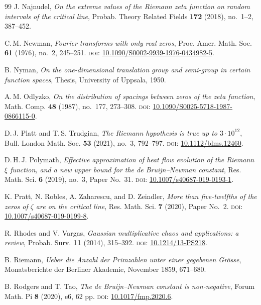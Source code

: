 \documentclass[11pt]{amsart}
\theoremstyle{definition}
\theoremstyle{remark}
\begin{document}
\begin{thebibliography}{99}
J. Najnudel,
\textit{On the extreme values of the Riemann zeta function on random intervals of the critical line},
Probab. Theory Related Fields \textbf{172} (2018), no.~1--2, 387--452.

C.\,M. Newman,
\textit{Fourier transforms with only real zeros},
Proc. Amer. Math. Soc. \textbf{61} (1976), no.~2, 245--251.
\textsc{doi:} \href{https://doi.org/10.1090/S0002-9939-1976-0434982-5}{10.1090/S0002-9939-1976-0434982-5}.

B. Nyman,
\textit{On the one-dimensional translation group and semi-group in certain function spaces},
Thesis, University of Uppsala, 1950.

A.\,M. Odlyzko,
\textit{On the distribution of spacings between zeros of the zeta function},
Math. Comp. \textbf{48} (1987), no.~177, 273--308.
\textsc{doi:} \href{https://doi.org/10.1090/S0025-5718-1987-0866115-0}{10.1090/S0025-5718-1987-0866115-0}.

D.\,J. Platt and T.\,S. Trudgian,
\textit{The Riemann hypothesis is true up to $3 \cdot 10^{12}$},
Bull. London Math. Soc. \textbf{53} (2021), no.~3, 792--797.
\textsc{doi:} \href{https://doi.org/10.1112/blms.12460}{10.1112/blms.12460}.

D.\,H.\,J. Polymath,
\textit{Effective approximation of heat flow evolution of the Riemann $\xi$ function, and a new upper bound for the de Bruijn--Newman constant},
Res. Math. Sci. \textbf{6} (2019), no.~3, Paper No.~31.
\textsc{doi:} \href{https://doi.org/10.1007/s40687-019-0193-1}{10.1007/s40687-019-0193-1}.

K. Pratt, N. Robles, A. Zaharescu, and D. Zeindler,
\textit{More than five-twelfths of the zeros of $\zeta$ are on the critical line},
Res. Math. Sci. \textbf{7} (2020), Paper No.~2.
\textsc{doi:} \href{https://doi.org/10.1007/s40687-019-0199-8}{10.1007/s40687-019-0199-8}.

R. Rhodes and V. Vargas,
\textit{Gaussian multiplicative chaos and applications: a review},
Probab. Surv. \textbf{11} (2014), 315--392.
\textsc{doi:} \href{https://doi.org/10.1214/13-PS218}{10.1214/13-PS218}.

B. Riemann,
\textit{Ueber die Anzahl der Primzahlen unter einer gegebenen Gr\"osse},
Monatsberichte der Berliner Akademie, November 1859, 671--680.

B. Rodgers and T. Tao,
\textit{The de Bruijn--Newman constant is non-negative},
Forum Math. Pi \textbf{8} (2020), e6, 62 pp.
\textsc{doi:} \href{https://doi.org/10.1017/fmp.2020.6}{10.1017/fmp.2020.6}.


\end{thebibliography}
\end{document}
